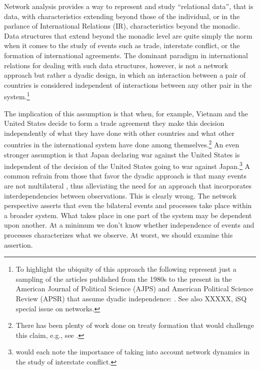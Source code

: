 Network analysis provides a way to represent and study ``relational data'', that is data, with characteristics extending beyond those of the individual, or in the parlance of International Relations (IR), characteristics beyond the monadic. Data structures that extend beyond the monadic level are quite simply the norm when it comes to the study of events such as trade, interstate conflict, or the formation of international agreements. The dominant paradigm in  international relations for dealing with such data structures, however, is not a network approach but rather a dyadic design, in which an interaction between a pair of countries is considered independent of interactions between any other pair in the system.\footnote{To highlight the ubiquity of this approach the following represent just a sampling of the articles published from the 1980s to the present in the American Journal of Political Science (AJPS) and American Political Science Review (APSR) that assume dyadic independence: \citet{dixon:1983,mansfield:etal:2000,lemke:reed:2001a,mitchell:2002,dafoe:2011a,fuhrmann:sechser:2014,carnegie:2014}. See also XXXXX, iSQ special issue on networks.} 

The implication of this assumption is that when, for example, Vietnam and the United States decide to form a trade agreement they make this decision independently of what they have done with other countries and what other countries in the international system have done among themselves.\footnote{There has been plenty of work done on treaty formation that would challenge this claim, e.g., see \citet{manger:etal:2012,kinne:2013}.} An even stronger assumption is that Japan declaring war against the United States is independent of the decision of the United States going to war against Japan.\footnote{\citet{maoz:etal:2006,ward:etal:2007,minhas:etal:2016} would each note the importance of taking into account network dynamics in the study of interstate conflict.} A common refrain from those that favor the dyadic approach is that many events are not multilateral \citep{diehl:wright:2016}, thus alleviating the need for an approach that incorporates interdependencies between observations. This is clearly wrong. The network perspective asserts that even the bilateral events and processes take place within a broader system. What takes place in one part of the system may be dependent upon another. At a minimum we don't know whether independence of events and processes characterizes what we observe. At worst, we should examine this assertion.  

